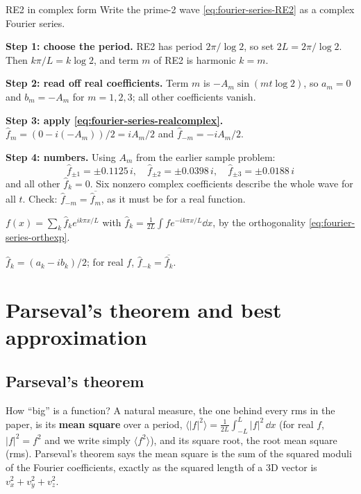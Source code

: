 \begin{sample}{RE2 in complex form}
Write the prime-2 wave \cref{eq:fourier-series-RE2} as a complex Fourier series.

\textbf{Step 1: choose the period.} RE2 has period $2\pi/\log2$, so set $2L=2\pi/\log 2$. Then $k\pi/L=k\log2$, and term $m$ of RE2 is harmonic $k=m$.

\textbf{Step 2: read off real coefficients.} Term $m$ is $-A_m\sin(m t\log2)$, so $a_m=0$ and $b_m=-A_m$ for $m=1,2,3$; all other coefficients vanish.

\textbf{Step 3: apply \cref{eq:fourier-series-realcomplex}.} $\hat f_m=(0-i(-A_m))/2=iA_m/2$ and $\hat f_{-m}=-iA_m/2$.

\textbf{Step 4: numbers.} Using $A_m$ from the earlier sample problem:
\[
\boxed{\hat f_{\pm1}=\pm0.1125\,i,\quad \hat f_{\pm2}=\pm0.0398\,i,\quad \hat f_{\pm3}=\pm0.0188\,i}
\]
and all other $\hat f_k=0$. Six nonzero complex coefficients describe the whole wave for all $t$. Check: $\hat f_{-m}=\overline{\hat f_m}$, as it must be for a real function.
\end{sample}

\begin{keyideas}
\item $f(x)=\sum_k\hat f_ke^{ik\pi x/L}$ with $\hat f_k=\frac1{2L}\int f e^{-ik\pi x/L}\dd x$, by the orthogonality \cref{eq:fourier-series-orthexp}.
\item $\hat f_k=(a_k-ib_k)/2$; for real $f$, $\hat f_{-k}=\overline{\hat f_k}$.
\end{keyideas}

\section{Parseval's theorem and best approximation}\label{sec:fourier-series-parseval}

\subsection{Parseval's theorem}

How ``big'' is a function? A natural measure, the one behind every rms in the paper, is its \textbf{mean square} over a period, $\langle|f|^2\rangle=\frac1{2L}\int_{-L}^{L}|f|^2\,\dd x$ (for real $f$, $|f|^2=f^2$ and we write simply $\langle f^2\rangle$), and its square root, the root mean square (rms). Parseval's theorem says the mean square is the sum of the squared moduli of the Fourier coefficients, exactly as the squared length of a 3D vector is $v_x^2+v_y^2+v_z^2$.

